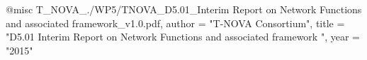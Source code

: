 @misc{ T_NOVA_./WP5/TNOVA_D5.01_Interim Report on Network Functions and associated framework_v1.0.pdf,
       author = "{T-NOVA Consortium}",
       title = "D5.01 Interim Report on Network Functions and associated framework ",
       year = "2015" }
